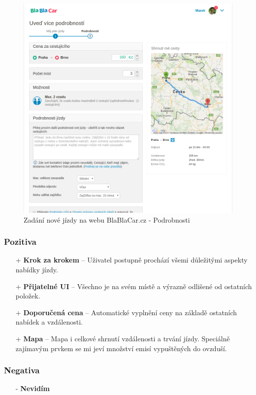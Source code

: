 \begin{figure}[h]
    \centering
    \includegraphics[width=1.0\textwidth]{media/blablacar/offer2.png}
    \caption{Zadání nové jízdy na webu BlaBlaCar.cz - Podrobnosti}
    \label{fig:blablacar:offer2}
\end{figure}
\subsubsection*{Pozitiva}
\begin{itemize}
    \item[+] \textbf{Krok za krokem} -- Uživatel postupně prochází všemi důležitými aspekty nabídky jízdy.
    \item[+] \textbf{Přijatelné UI} -- Všechno je na svém místě a výrazně odlišené od ostatních položek.
    \item[+] \textbf{Doporučená cena} -- Automatické vyplnění ceny na základě ostatních nabídek a vzdálenosti.
    \item[+] \textbf{Mapa} -- Mapa i celkové shrnutí vzdálenosti a trvání jízdy. Speciálně zajímavým prvkem se mi jeví množství emisí vypuštěných do ovzduší.
\end{itemize}
\subsubsection*{Negativa}
\begin{itemize}
    \item[-] \textbf{Nevidím}
\end{itemize}


